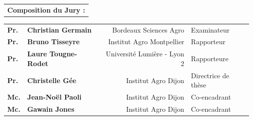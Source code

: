 \documentclass[12pt, a4paper, twoside]{scrbook}
\begin{document}
\begin{titlepage}
            \null \vfill
            \noindent
			\begin{tabularx}{\linewidth}{l}
				 \textbf{Composition du Jury :} \\[.25cm]
            \end{tabularx}
            \begin{tabularx}{\linewidth}{l X r l}
				 \textbf{Pr.} & \textbf{Christian Germain} 		& {Bordeaux Sciences Agro}      & Examinateur  \\
				 \textbf{Pr.} & \textbf{Bruno Tisseyre} 	    & {Institut Agro Montpellier}   & Rapporteur  \\
                 \textbf{Pr.} & \textbf{Laure Tougne-Rodet} 	& {Université Lumière - Lyon 2} & Rapporteure  \\
				 \textbf{Pr.} & \textbf{Christelle Gée} 		& {Institut Agro Dijon}         & Directrice de thèse \\
				 \textbf{Mc.} & \textbf{Jean-Noël Paoli} 		& {Institut Agro Dijon}         & Co-encadrant \\
				 \textbf{Mc.} & \textbf{Gawain Jones} 			& {Institut Agro Dijon}         & Co-encadrant \\
			\end{tabularx}
    \end{titlepage}
	\newpage
	\thispagestyle{empty}
	\null \vfill
\end{document}
